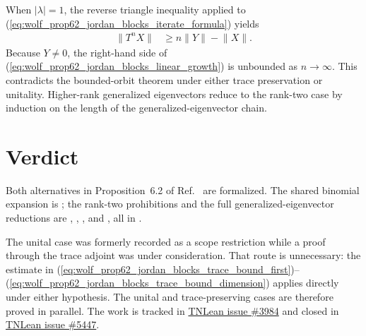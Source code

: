 \documentclass{article}
\begin{document}
When $|\lambda|=1$, the reverse triangle inequality applied to
(\ref{eq:wolf_prop62_jordan_blocks_iterate_formula}) yields
\begin{align}
    \lVert T^nX\rVert
        &\geq n\lVert Y\rVert-\lVert X\rVert.
    \label{eq:wolf_prop62_jordan_blocks_linear_growth}
\end{align}
Because $Y\neq0$, the right-hand side of
(\ref{eq:wolf_prop62_jordan_blocks_linear_growth}) is unbounded as
$n\to\infty$. This contradicts the bounded-orbit theorem under either trace
preservation or unitality. Higher-rank generalized eigenvectors reduce to the
rank-two case by induction on the length of the generalized-eigenvector chain.

\section{Verdict}

Both alternatives in Proposition~6.2 of Ref.~\cite{Wolf2012Quantum} are
formalized. The shared binomial expansion is
; the rank-two prohibitions and
the full generalized-eigenvector reductions are
,
,
, and
, all in
.

The unital case was formerly recorded as a scope restriction while a proof
through the trace adjoint was under consideration. That route is unnecessary:
the estimate in
(\ref{eq:wolf_prop62_jordan_blocks_trace_bound_first})--%
(\ref{eq:wolf_prop62_jordan_blocks_trace_bound_dimension}) applies directly
under either hypothesis. The unital and trace-preserving cases are therefore
proved in parallel. The work is tracked in
\href{https://github.com/LionSR/TNLean/issues/3984}{TNLean issue \#3984} and
closed in
\href{https://github.com/LionSR/TNLean/issues/5447}{TNLean issue \#5447}.



\end{document}
